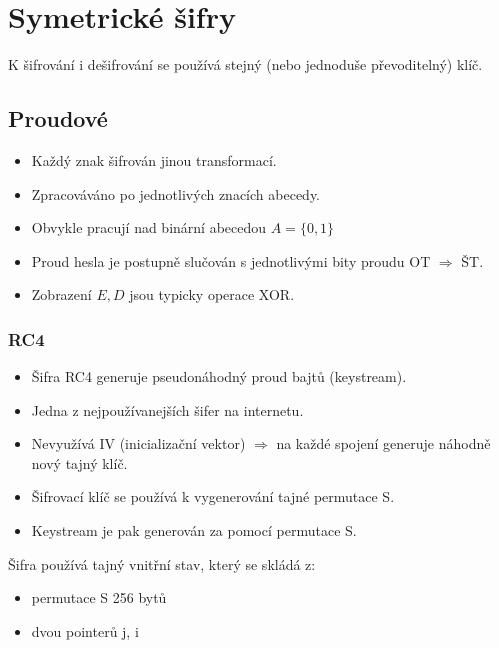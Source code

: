 \documentclass{szzclass}
\begin{document}
\section{Symetrické šifry}
K šifrování i dešifrování se používá stejný (nebo jednoduše převoditelný) klíč.

\subsection{Proudové}
\begin{itemize}
\item Každý znak šifrován jinou transformací.
\item Zpracováváno po jednotlivých znacích abecedy.
\item Obvykle pracují nad binární abecedou $A=\{0,1\}$
\item Proud hesla je postupně slučován s jednotlivými bity proudu OT $\Rightarrow$ ŠT.
\item Zobrazení $E, D$ jsou typicky operace XOR.
\end{itemize}

\subsubsection{RC4}
\begin{itemize}
\item Šifra RC4 generuje pseudonáhodný proud bajtů (keystream).
\item Jedna z nejpoužívanejších šifer na internetu.
\item Nevyužívá IV (inicializační vektor) $\Rightarrow$ na každé spojení generuje náhodně nový tajný klíč.
\item Šifrovací klíč se používá k vygenerování tajné permutace S.
\item Keystream je pak generován za pomocí permutace S.
\end{itemize}

Šifra používá tajný vnitřní stav, který se skládá z:
\begin{itemize}
\item permutace S 256 bytů
\item dvou pointerů j, i
\end{itemize}


\end{document}
